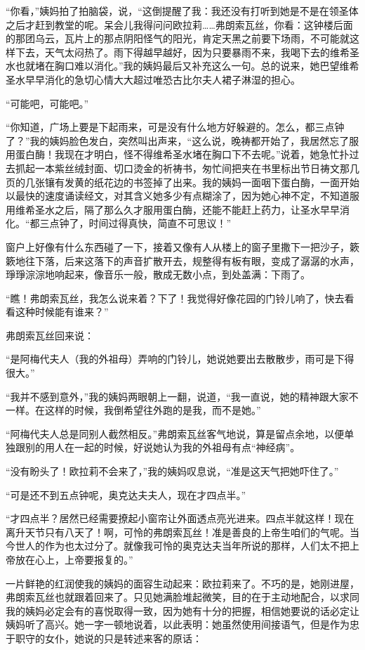 \par “你看，”姨妈拍了拍脑袋，说，“这倒提醒了我：我还没有打听到她是不是在领圣体之后才赶到教堂的呢。呆会儿我得问问欧拉莉……弗朗索瓦丝，你看：这钟楼后面的那团乌云，瓦片上的那点阴阳怪气的阳光，肯定天黑之前要下场雨，不可能就这样下去，天气太闷热了。雨下得越早越好，因为只要暴雨不来，我喝下去的维希圣水也就堵在胸口难以消化。”我的姨妈最后又补充这么一句。总的说来，她巴望维希圣水早早消化的急切心情大大超过唯恐古比尔夫人裙子淋湿的担心。
\par “可能吧，可能吧。”
\par “你知道，广场上要是下起雨来，可是没有什么地方好躲避的。怎么，都三点钟了？”我的姨妈脸色发白，突然叫出声来，“这么说，晚祷都开始了，我居然忘了服用蛋白酶！我现在才明白，怪不得维希圣水堵在胸口下不去呢。”说着，她急忙扑过去抓起一本紫丝绒封面、切口烫金的祈祷书，匆忙间把夹在书里标出节日祷文那几页的几张镶有发黄的纸花边的书签掉了出来。我的姨妈一面咽下蛋白酶，一面开始以最快的速度诵读经文，对其含义她多少有点糊涂了，因为她心神不定，不知道服用维希圣水之后，隔了那么久才服用蛋白酶，还能不能赶上药力，让圣水早早消化。“都三点钟了，时间过得真快，简直不可思议！”
\par 窗户上好像有什么东西碰了一下，接着又像有人从楼上的窗子里撒下一把沙子，簌簌地往下落，后来这落下的声音扩散开去，规整得有板有眼，变成了潺潺的水声，琤琤淙淙地响起来，像音乐一般，散成无数小点，到处盖满：下雨了。
\par “瞧！弗朗索瓦丝，我怎么说来着？下了！我觉得好像花园的门铃儿响了，快去看看这种时候能有谁来？”
\par 弗朗索瓦丝回来说：
\par “是阿梅代夫人（我的外祖母）弄响的门铃儿，她说她要出去散散步，雨可是下得很大。”
\par “我并不感到意外，”我的姨妈两眼朝上一翻，说道，“我一直说，她的精神跟大家不一样。在这样的时候，我倒希望往外跑的是我，而不是她。”
\par “阿梅代夫人总是同别人截然相反。”弗朗索瓦丝客气地说，算是留点余地，以便单独跟别的用人在一起的时候，好说她认为我的外祖母有点“神经病”。
\par “没有盼头了！欧拉莉不会来了，”我的姨妈叹息说，“准是这天气把她吓住了。”
\par “可是还不到五点钟呢，奥克达夫夫人，现在才四点半。”
\par “才四点半？居然已经需要撩起小窗帘让外面透点亮光进来。四点半就这样！现在离升天节只有八天了！啊，可怜的弗朗索瓦丝！准是善良的上帝生咱们的气呢。当今世人的作为也太过分了。就像我可怜的奥克达夫当年所说的那样，人们太不把上帝放在心上，上帝要报复的。”
\par 一片鲜艳的红润使我的姨妈的面容生动起来：欧拉莉来了。不巧的是，她刚进屋，弗朗索瓦丝也就跟着回来了。只见她满脸堆起微笑，目的在于主动地配合，以求同我的姨妈必定会有的喜悦取得一致，因为她有十分的把握，相信她要说的话必定让姨妈听了高兴。她一字一顿地说着，以此表明：她虽然使用间接语气，但是作为忠于职守的女仆，她说的只是转述来客的原话：
